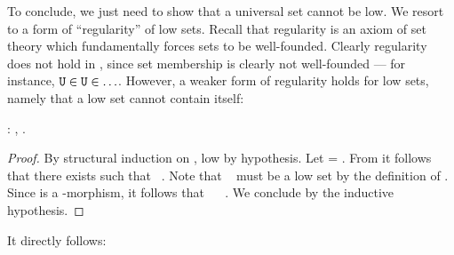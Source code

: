 To conclude, we just need to show that a universal set cannot be low. We resort to a form of ``regularity'' of low sets. Recall that regularity is an axiom of \ZF{} set theory which fundamentally forces sets to be well-founded. Clearly regularity does not hold in \NFTWO{}, since set membership is clearly not well-founded --- for instance, $\text{\texttt{U}} \in \text{\texttt{U}} \in \ldots$. However, a weaker form of regularity holds for low sets, namely that a low set cannot contain itself:

\begin{coqdoccode}
  \coqdocnoindent
{} : \coqdockw{\ensuremath{\forall}} ,     \INX {}  .\coqdoceol
\end{coqdoccode}
\begin{proof}
  By structural induction on , low by hypothesis. Let  =   . From  \INX {} it follows that there exists  such that  \EQX {}~. Note that ~ must be a low set by the definition of . Since  is a -morphism, it follows that ~ \INX {}~. We conclude by the inductive hypothesis.
\end{proof}

It directly follows:

